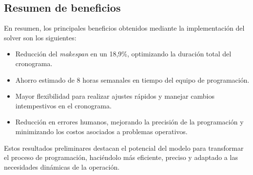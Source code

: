 \documentclass{article}
\begin{document}
\subsection{Resumen de beneficios}

En resumen, los principales beneficios obtenidos mediante la implementación del solver son los siguientes:
\begin{itemize}
    \item Reducción del \textit{makespan} en un 18,9\%, optimizando la duración total del cronograma.
    \item Ahorro estimado de 8 horas semanales en tiempo del equipo de programación.
    \item Mayor flexibilidad para realizar ajustes rápidos y manejar cambios intempestivos en el cronograma.
    \item Reducción en errores humanos, mejorando la precisión de la programación y minimizando los costos asociados a problemas operativos.
\end{itemize}

Estos resultados preliminares destacan el potencial del modelo para transformar el proceso de programación, haciéndolo más eficiente, preciso y adaptado a las necesidades dinámicas de la operación.
\end{document}
